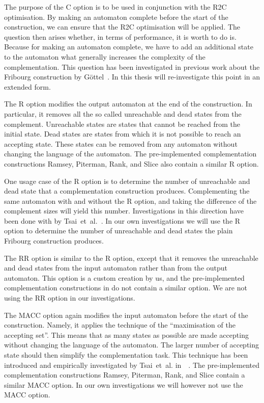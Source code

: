 The purpose of the C option is to be used in conjunction with the R2C optimisation. By making an automaton complete before the start of the construction, we can ensure that the R2C optimisation will be applied. The question then arises whether, in terms of performance, it is worth to do is. Because for making an automaton complete, we have to add an additional state to the automaton what generally increases the complexity of the complementation. This question has been investigated in previous work about the Fribourg construction by Göttel~\cite{2013_bsc_goettel}. In this thesis will re-investigate this point in an extended form.

The R option modifies the output automaton at the end of the construction. In particular, it removes all the so called unreachable and dead states from the complement. Unreachable states are states that cannot be reached from the initial state. Dead states are states from which it is not possible to reach an accepting state. These states can be removed from any automaton without changing the language of the automaton. The pre-implemented complementation constructions Ramsey, Piterman, Rank, and Slice also contain a similar R option.

One usage case of the R option is to determine the number of unreachable and dead state that a complementation construction produces. Complementing the same automaton with and without the R option, and taking the difference of the complement sizes will yield this number. Investigations in this direction have been done with \goal{} by Tsai~et~al.~\cite{2011_tsai}. In our own investigations we will use the R option to determine the number of unreachable and dead states the plain Fribourg construction produces.

The RR option is similar to the R option, except that it removes the unreachable and dead states from the input automaton rather than from the output automaton. This option is a custom creation by us, and the pre-implemented complementation constructions in \goal{} do not contain a similar option. We are not using the RR option in our investigations.

The MACC option again modifies the input automaton before the start of the construction. Namely, it applies the technique of the ``maximisation of the accepting set''. This means that as many states as possible are made accepting without changing the language of the automaton. The larger number of accepting state should then simplify the complementation task. This technique has been introduced and empirically investigated by Tsai~et~al. in~~\cite{2011_tsai}. The pre-implemented complementation constructions Ramsey, Piterman, Rank, and Slice contain a similar MACC option. In our own investigations we will however not use the MACC option.

